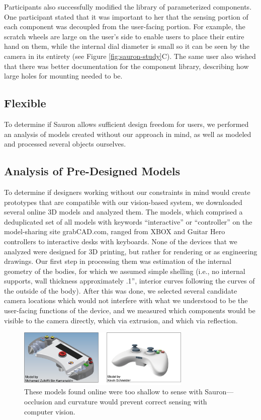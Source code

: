     Participants also successfully modified the library of parameterized components. One participant stated that it was important to her that the sensing portion of each component was decoupled from the user-facing portion. For example, the scratch wheels are large on the user's side to enable users to place their entire hand on them, while the internal dial diameter is small so it can be seen by the camera in its entirety (see Figure \ref{fig:sauron-study}C). The same user also wished that there was better documentation for the component library, describing how large holes for mounting needed to be.


    \subsection{Flexible}
    
    To determine if Sauron allows sufficient design freedom for users, we performed an analysis of models created without our approach in mind, as well as modeled and processed several objects ourselves.
    
    \subsection{Analysis of Pre-Designed Models}
    To determine if designers working without our constraints in mind would create prototypes that are compatible with our vision-based system, we downloaded several online 3D models and analyzed them. The models, which comprised a deduplicated set of all models with keywords ``interactive'' or ``controller'' on the model-sharing site grabCAD.com, ranged from XBOX and Guitar Hero controllers to interactive desks with keyboards. None of the devices that we analyzed were designed for 3D printing, but rather for rendering or as engineering drawings.  Our first step in processing them was estimation of the internal geometry of the bodies, for which we assumed simple shelling (i.e., no internal supports, wall thickness approximately .1'', interior curves following the curves of the outside of the body). After this was done, we selected several candidate camera locations which would not interfere with what we understood to be the user-facing functions of the device, and we measured which components would be visible to the camera directly, which via extrusion, and which via reflection. 
    
    \begin{figure}
\centering
\includegraphics[width=3.25in]{figures/sauron/shallow-models.png}
\caption{These models found online were too shallow to sense with Sauron---occlusion and curvature would prevent correct sensing with computer vision.}
\label{fig:sauron-premade}
\end{figure}

